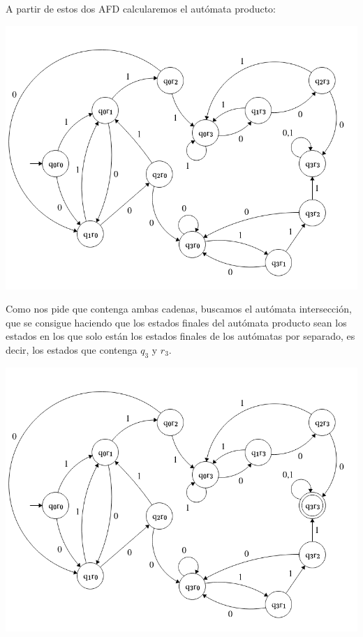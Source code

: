 \documentclass[12pt, spanish]{article}
\begin{document}
\newpage

A partir de estos dos AFD calcularemos el autómata producto:


\begin{center}
	\includegraphics[scale=0.45]{aut_pro.png}
\end{center}

Como nos pide que contenga ambas cadenas, buscamos el autómata intersección, que se consigue haciendo que los estados finales del autómata producto sean los estados en los que solo están los estados finales de los autómatas por separado, es decir, los estados que contenga $q_3$ y $r_3$.

\begin{center}
	\includegraphics[scale=0.45]{aut_inter.png}
\end{center}
\end{document}
